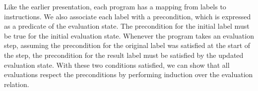 Like the earlier presentation, each program has a mapping from labels to instructions.
We also associate each label with a precondition, which is expressed as a predicate of the evaluation state.
The precondition for the initial label must be true for the initial evaluation state.
Whenever the program takes an evaluation step, assuming the precondition for the original label was satisfied at the start of the step, the precondition for the result label must be satisfied by the updated evaluation state.
With these two conditions satisfied, we can show that all evaluations respect the preconditions by performing induction over the evaluation relation.


